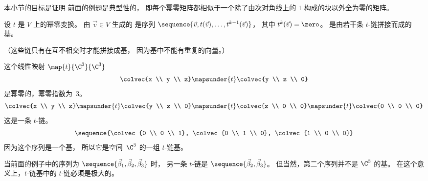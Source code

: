 本小节的目标是证明
前面的例题是典型性的，
即每个幂零矩阵都相似于一个除了由次对角线上的
$1$ 构成的块以外全为零的矩阵。

\begin{definition}
设 \( t \) 是 \( V \) 上的幂零变换。
由 \( \vec{v}\in V \) 生成的
是序列
\( \sequence{\vec{v},t(\vec{v}),\ldots,t^{k-1}(\vec{v})} \)，
其中 $t^k(\vec{v})=\zero$。
是由若干条 \( t \)-链拼接而成的基。
\end{definition}

\noindent （这些链只有在互不相交时才能拼接成基，
因为基中不能有重复的向量。）

\begin{example}
这个线性映射 \( \map{t}{\C^3}{\C^3} \)
\begin{equation*}
  \colvec{x \\ y \\ z}\mapsunder{t}\colvec{y \\ z \\ 0}
\end{equation*}
是幂零的，幂零指数为~$3$。
\begin{equation*}
  \colvec{x \\ y \\ z}
  \mapsunder{t}\colvec{y \\ z \\ 0}
  \mapsunder{t}\colvec{z \\ 0 \\ 0}
  \mapsunder{t}\colvec{0 \\ 0 \\ 0}
\end{equation*}
这是一条 $t$-链。
\begin{equation*}
  \sequence{\colvec{0 \\ 0 \\ 1},
            \colvec{0 \\ 1 \\ 0},
            \colvec{1 \\ 0 \\ 0}}
\end{equation*}
因为这个序列是一个基，
所以它是空间~$\C^3$ 的一组 $t$-链基。
\end{example}

当前面的例子中的序列为
$\sequence{\vec{\beta}_1,
             \vec{\beta}_2,
             \vec{\beta}_3}$ 时，
另一条 $t$-链是
$\sequence{\vec{\beta}_2,
             \vec{\beta}_3}$。
但当然，第二个序列并不是 $\C^3$ 的基。
在这个意义上，$t$-链基中的 $t$-链必须是极大的。

